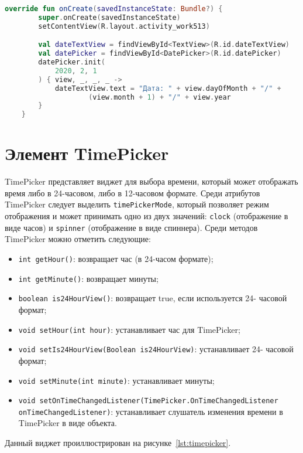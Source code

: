 \begin{lstlisting}[language=Kotlin, caption=\leftline{datepicker Kotlin}, label=lst:datepickerKotlin]
override fun onCreate(savedInstanceState: Bundle?) {
        super.onCreate(savedInstanceState)
        setContentView(R.layout.activity_work513)

        val dateTextView = findViewById<TextView>(R.id.dateTextView)
        val datePicker = findViewById<DatePicker>(R.id.datePicker)
        datePicker.init(
            2020, 2, 1
        ) { view, _, _, _ ->
            dateTextView.text = "Дата: " + view.dayOfMonth + "/" +
                    (view.month + 1) + "/" + view.year
        }
    }
\end{lstlisting}

\section{Элемент TimePicker}
TimePicker представляет виджет для выбора времени, который может 
отображать время либо в 24-часовом, либо в 12-часовом формате. Среди 
атрибутов TimePicker следует выделить \texttt{timePickerMode},
который позволяет режим отображения и может принимать одно из двух значений:
\texttt{clock} (отображение в виде часов) и
\texttt{spinner} (отображение в виде спиннера).
Среди методов TimePicker можно отметить следующие:

\begin{itemize}
	\item \texttt{int getHour()}: возвращает час (в 24-часом формате);
	\item \texttt{int getMinute()}: возвращает минуты;
	\item \texttt{boolean is24HourView()}: возвращает true, если
		используется 24- часовой формат;
	\item \texttt{void setHour(int hour)}: устанавливает час для TimePicker;
	\item \texttt{void setIs24HourView(Boolean is24HourView)}:
		устанавливает 24- часовой формат;
	\item \texttt{void setMinute(int minute)}: устанавливает минуты;
	\item \texttt{void setOnTimeChangedListener(TimePicker.OnTimeChangedListener 
		onTimeChangedListener)}: устанавливает слушатель изменения времени 
		в TimePicker в виде объекта.
\end{itemize}

Данный виджет проиллюстрирован на рисунке~\ref{lst:timepicker}.

